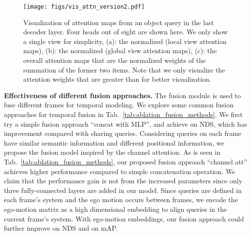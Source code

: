 \documentclass[10pt,twocolumn,letterpaper]{article}
\begin{document}
\begin{figure*}[t]
\centering
\texttt{[image: figs/vis\_attn\_version2.pdf]}
\vspace{-10pt}
\caption{Visualization of attention maps from an object query in the last decoder layer. Four heads out of eight are shown here. We only show a single view for simplicity, (a): the normalized  (local view attention maps), (b): the normalized  (global view attention maps), (c): the overall attention maps that are the normalized weights of the summation of the former two items.
Note that we only visualize the attention weights that are greater than  for better visualization.
}
\centering
\label{fig:vis_attn}
\vspace{-10pt}
\end{figure*}

\vspace{2mm}
\noindent\textbf{Effectiveness of different fusion approaches.}
The fusion module is used to fuse different frames for temporal modeling. We explore some common fusion approaches for temporal fusion in Tab.~\ref{tab:ablation_fusion_methods}. We first try a simple fusion approach ``concat with MLP'', and achieve  on NDS, which has  improvement compared with sharing queries. Considering queries on each frame have similar semantic information and different positional information, we propose the fusion model inspired by the channel attention. As is seen in Tab.~\ref{tab:ablation_fusion_methods}, our proposed fusion approach ``channel att'' achieves higher performance compared to simple concatenation operation. 
We claim that the performance gain is not from the increased parameters since only three fully-connected layers are added in our model.
Since queries are defined in each frame's system and the ego motion occurs between frames, we encode the ego-motion matrix as a high dimensional embedding to align queries in the current frame's system. With ego-motion embeddings, our fusion approach could further improve  on NDS and  on mAP.  
\end{document}
